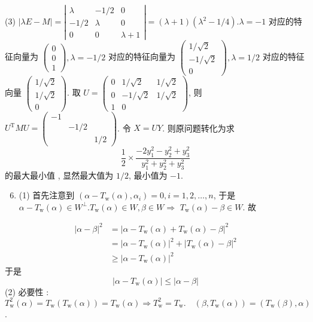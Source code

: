 \documentclass[10pt]{article}
\begin{document}
(3) $|\lambda E-M|=\left|\begin{array}{ccc}\lambda & -1 / 2 & 0 \\ -1 / 2 & \lambda & 0 \\ 0 & 0 & \lambda+1\end{array}\right|=(\lambda+1)\left(\lambda^{2}-1 / 4\right) . \lambda=-1$  对应的特征向量为  $\left(\begin{array}{l}0 \\ 0 \\ 1\end{array}\right), \lambda=-1 / 2$  对应的特征向量为  $\left(\begin{array}{c}1 / \sqrt{2} \\ -1 / \sqrt{2} \\ 0\end{array}\right), \lambda=1 / 2$  对应的特征向量  $\left(\begin{array}{c}1 / \sqrt{2} \\ 1 / \sqrt{2} \\ 0\end{array}\right)$.  取  $U=\left(\begin{array}{ccc}0 & 1 / \sqrt{2} & 1 / \sqrt{2} \\ 0 & -1 / \sqrt{2} & 1 / \sqrt{2} \\ 1 & 0\end{array}\right)$,  则  $U^{\mathrm{T}} M U=\left(\begin{array}{ccc}-1 & & \\ & -1 / 2 & \\ & & 1 / 2\end{array}\right)$.  令  $X=U Y$.  则原问题转化为求 
$$
\frac{1}{2} \times \frac{-2 y_{1}^{2}-y_{2}^{2}+y_{3}^{2}}{y_{1}^{2}+y_{2}^{2}+y_{3}^{2}}
$$
 的最大最小值 ,  显然最大值为  $1 / 2$,  最小值为  $-1$.

\begin{enumerate}
  \setcounter{enumi}{5}
  \item (1)  首先注意到  $\left(\alpha-T_{\mathrm{w}}(\alpha), \alpha_{i}\right)=0, i=1,2, \ldots, n$,  于是  $\alpha-T_{\mathrm{w}}(\alpha) \in W^{\perp} . T_{\mathrm{w}}(\alpha) \in W, \beta \in W \Rightarrow$ $T_{\mathrm{w}}(\alpha)-\beta \in W$.  故 
\end{enumerate}
$$
\begin{aligned}
|\alpha-\beta|^{2} &=\left|\alpha-T_{\mathrm{w}}(\alpha)+T_{\mathrm{w}}(\alpha)-\beta\right|^{2} \\
&=\left|\alpha-T_{\mathrm{w}}(\alpha)\right|^{2}+\left|T_{\mathrm{w}}(\alpha)-\beta\right|^{2} \\
& \geq\left|\alpha-T_{\mathrm{w}}(\alpha)\right|^{2}
\end{aligned}
$$
 于是 
$$
\left|\alpha-T_{\mathrm{w}}(\alpha)\right| \leq|\alpha-\beta|
$$
(2)  必要性 : $T_{\mathrm{w}}^{2}(\alpha)=T_{\mathrm{w}}\left(T_{\mathrm{w}}(\alpha)\right)=T_{\mathrm{w}}(\alpha) \Longrightarrow T_{\mathrm{w}}^{2}=T_{\mathrm{w}} . \quad\left(\beta, T_{\mathrm{w}}(\alpha)\right)=\left(T_{\mathrm{w}}(\beta), \alpha\right)$.
\end{document}
